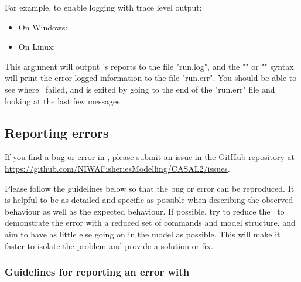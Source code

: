 For example, to enable logging with trace level output:

\begin{itemize}
	\item On Windows: 
	\item On Linux: 
\end{itemize}

This argument will output \CNAME's reports to the file "run.log", and the "" or "" syntax will print the error logged information to the file "run.err". You should be able to see where \CNAME\ failed, and is exited by going to the end of the "run.err" file and looking at the last few messages.

\subsection{Reporting errors\label{sec:ReportingErrors}}

If you find a bug or error in \CNAME, please submit an issue in the GitHub repository at \url{https://github.com/NIWAFisheriesModelling/CASAL2/issues}.

Please follow the guidelines below so that the bug or error can be reproduced. It is helpful to be as detailed and specific as possible when describing the observed behaviour as well as the expected behaviour. If possible, try to reduce the \config\ to demonstrate the error with a reduced set of commands and model structure, and aim to have as little else going on in the model as possible. This will make it faster to isolate the problem and provide a solution or fix.

\subsubsection{Guidelines for reporting an error with \CNAME\label{sec:ErrorGuidelines}}

